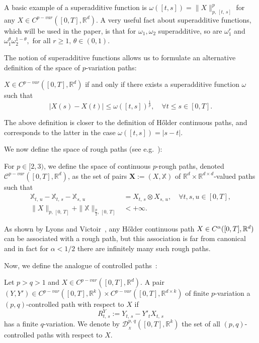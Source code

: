 \documentclass[AHL,Unicode,longabstracts,published]{cedram}
\newcommand{\bfX}{\mathbf{X}}
\newcommand{\bbX}{\mathbb{X}}
\newcommand{\calD}{\mathcal{D}}
\newcommand{\calC}{\mathcal{C}}
\newcommand{\Rr}{{\mathbb{R}}}
\newcommand*{\romanenumi}{\renewcommand*{\theenumi}{\roman{enumi}}}
\let\oldforall\forall
\renewcommand*{\forall}{\mathrel{\oldforall}}
\begin{document}
A basic example of a superadditive function is $\omega([t,s])=\|X\|^p_{p,\,[t,\,s]}$ for any $X\in C^{p-var}([0,T],\Rr^d).$ A very useful fact about superadditive functions, which will be used in the paper, is that for $\omega_1, \omega_2$ superadditive, so are $\omega_1^{r}$ and $\omega_1^{\theta}\omega_2^{1-\theta},$ for all $r\geq 1,\, \theta\in (0,1).$

The notion of superadditive functions allows us to formulate an alternative definition of the space of $p$-variation paths:

\begin{prop*}
$X\in C^{p-var}([0,T],\Rr^d)$ if and only if there exists a superadditive function $\omega$ such that
\[
\left|X(s)-X(t)\right|\leq \omega([t,s])^{\frac 1 p},\quad \forall t\leq s\in[0,T].
\]
\end{prop*}

The above definition is closer to the definition of H\H older continuous paths, and corresponds to the latter in the case $\omega([t,s])=|s-t|.$


We now define the space of rough paths (see e.g.~\cite[Section~1.2.4]{FritzShekhar}):
\begin{defi}\label{def.roughpath}
For $p\in[2, 3)$, we define the space of continuous $p$-rough paths, denoted $\calC^{p-var}([0,T], \Rr^d)$, as the set of pairs $\bfX:=(X,\bbX)$ of $\Rr^d\times\Rr^{d\times d}$-valued paths such that
\begin{align}
\tag{\rm i} \bbX_{t,\,u}-\bbX_{t,\,s}-\bbX_{s,\,u} &=X_{t,\,s}\otimes X_{s,\,u},\quad \forall t,s,u\in[0,T],\label{defi2.3.1}
\\
\tag{\rm ii}
\|X\|_{p,\,[0,\,T]}+ \|\bbX\|_{{\frac p 2},\,[0,\,T]} &<+\infty.\label{defi2.3.2}
\end{align}
\end{defi}

As shown by Lyons and Victoir~\cite{LV07}, any H\H older continuous path $X\in C^\alpha([0,T],\linebreak\Rr^d)$ can be associated with a rough path, but this association is far from canonical and in fact for $\alpha<1/2$ there are infinitely many such rough paths.


Now, we define the analogue of controlled paths~\cite[Definition~1]{gubinelli2004}:
\begin{defi}\label{chp02def:conrtollab}
Let $p>q>1$ and $X\in C^{p-var}([0,T],\Rr^d)$. A pair $(Y,Y')\in C^{p-var}([0,T],\Rr^k)\times C^{p-var}([0,T],\Rr^{d\times k})$ of finite $p$-variation a $(p, q)$-controlled path with respect to $X$ if
\[
R^Y_{t,\,s} {:=} Y_{t,\,s} - Y'_t X_{t,\,s}
\]
has a finite $q$-variation. We denote by $\calD^{p,\,q}_{_X}([0,T], \Rr^k)$ the set of all $(p, q)$-controlled paths with respect to $X$.
\end{defi}
\end{document}
